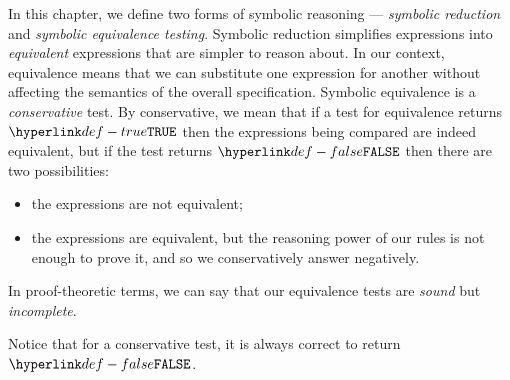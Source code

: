 In this chapter, we define two forms of symbolic reasoning ---
\emph{symbolic reduction} and \emph{symbolic equivalence testing}.
Symbolic reduction simplifies expressions into \emph{equivalent} expressions
that are simpler to reason about.
In our context, equivalence means that we can substitute one expression for another without
affecting the semantics of the overall specification.
%
Symbolic equivalence is a \emph{conservative} test.
By conservative, we mean that if a test for equivalence returns $\True$ then the expressions
being compared are indeed equivalent, but if the test returns $\False$ then
there are two possibilities:
\begin{itemize}
  \item the expressions are not equivalent;
  \item the expressions are equivalent, but the reasoning power of our rules
  is not enough to prove it, and so we conservatively answer negatively.
\end{itemize}
In proof-theoretic terms, we can say that our equivalence tests are \emph{sound} but \emph{incomplete}.

Notice that for a conservative test, it is always correct to return $\False$.

